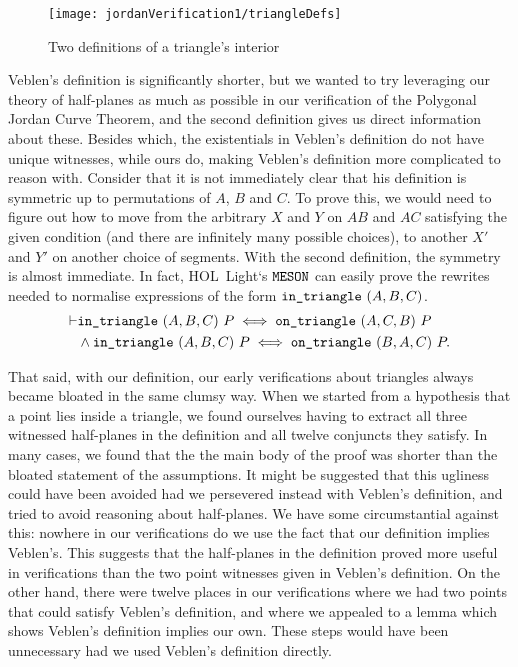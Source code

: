 \begin{figure}
\centering\texttt{[image: jordanVerification1/triangleDefs]}
\caption{Two definitions of a triangle's interior}
\label{fig:triangleDefs}
\end{figure}

Veblen's definition is significantly shorter, but we wanted to try leveraging our theory of half-planes as much as possible in our verification of the Polygonal Jordan Curve Theorem, and the second definition gives us direct information about these. Besides which, the existentials in Veblen's definition do not have unique witnesses, while ours do, making Veblen's definition more complicated to reason with. Consider that it is not immediately clear that his definition is symmetric up to permutations of $A$, $B$ and $C$. To prove this, we would need to figure out how to move from the arbitrary $X$ and $Y$ on $AB$ and $AC$ satisfying the given condition (and there are infinitely many possible choices), to another $X'$ and $Y'$ on another choice of segments. With the second definition, the symmetry is almost immediate. In fact, HOL~Light`s $\texttt{MESON}$ can easily prove the rewrites needed to normalise expressions of the form $\texttt{in\_triangle}\ (A,B,C)$. 
\begin{equation}\label{eq:triSyms}
  \begin{split}
    \vdash&\code{in\_triangle}\ (A,B,C)\ P \iff \code{on\_triangle}\ (A,C,B)\ P\\
&    \wedge \code{in\_triangle}\ (A,B,C)\ P \iff \code{on\_triangle}\ (B,A,C)\ P.
  \end{split}
\end{equation}

That said, with our definition, our early verifications about triangles always became bloated in the same clumsy way. When we started from a hypothesis that a point lies inside a triangle, we found ourselves having to extract all three witnessed half-planes in the definition and all twelve conjuncts they satisfy. In many cases, we found that the the main body of the proof was shorter than the bloated statement of the assumptions. It might be suggested that this ugliness could have been avoided had we persevered instead with Veblen's definition, and tried to avoid reasoning about half-planes. We have some circumstantial against this: nowhere in our verifications do we use the fact that our definition implies Veblen's. This suggests that the half-planes in the definition proved more useful in verifications than the two point witnesses given in Veblen's definition. On the other hand, there were twelve places in our verifications where we had two points that could satisfy Veblen's definition, and where we appealed to a lemma which shows Veblen's definition implies our own. These steps would have been unnecessary had we used Veblen's definition directly. 

